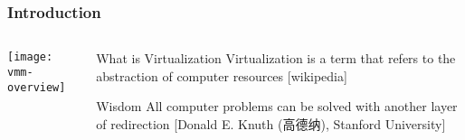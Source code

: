 %
%
\begin{frame}[plain]
	\frametitle{Introduction}
	
	
	
	\begin{columns}
		
		\begin{column}{.4\textwidth}
			
			\texttt{[image: vmm-overview]}
			
		\end{column}
		
		\begin{column}{.6\textwidth}
			
		
			\begin{block}{What is Virtualization}
				Virtualization is a term that refers to the abstraction of computer resources [wikipedia]
			\end{block}
		
			\begin{block}{Wisdom}
				All computer problems can be solved with another layer of redirection [Donald E. Knuth (高德纳), Stanford University]
			\end{block}

		\end{column}
		
		
	\end{columns}
	
	
\end{frame}


